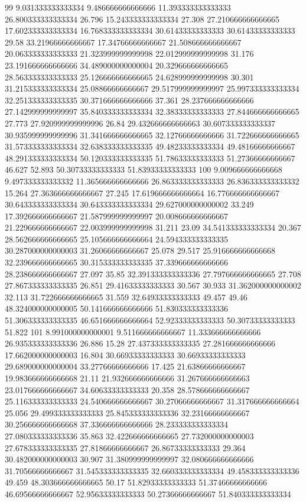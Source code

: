 99 9.031333333333334 9.486666666666666 11.393333333333333 26.800333333333334 26.796 15.243333333333334 27.308 27.210666666666665 17.602333333333334 16.768333333333334 30.61433333333333 30.61433333333333 29.58 33.21966666666667 17.34766666666667 21.508666666666667 20.063333333333333 21.323999999999998 22.012999999999998 31.176 23.191666666666666 34.489000000000004 20.329666666666665 28.563333333333333 25.126666666666665 24.628999999999998 30.301 31.215333333333334 25.08866666666667 29.517999999999997 25.997333333333334 32.251333333333335 30.371666666666666 37.361 28.237666666666666 27.142999999999997 35.840333333333334 32.38333333333333 27.844666666666665 27.773 27.920999999999996 26.84 29.432666666666663 30.607333333333337 30.935999999999996 31.341666666666665 32.12766666666666 31.722666666666665 31.573333333333334 32.638333333333335 49.48233333333334 49.48166666666667 48.291333333333334 50.120333333333335 51.78633333333333 51.27366666666667 46.627 52.893 50.30733333333333 51.83933333333333
100 9.009666666666668 9.497333333333332 11.365666666666666 26.863333333333333 26.836333333333332 15.264 27.363666666666667 27.245 17.619666666666664 16.776666666666667 30.643333333333334 30.643333333333334 29.627000000000002 33.249 17.392666666666667 21.587999999999997 20.008666666666667 21.229666666666667 22.003999999999998 31.211 23.09 34.541333333333334 20.367 28.562666666666665 25.105666666666664 24.594333333333335 30.287000000000003 31.26066666666667 25.078 29.517 25.916666666666668 32.239666666666665 30.315333333333335 37.339666666666666 28.238666666666667 27.097 35.85 32.391333333333336 27.797666666666665 27.708 27.867333333333335 26.851 29.41633333333333 30.567 30.933 31.362000000000002 32.113 31.722666666666665 31.559 32.64933333333333 49.457 49.46 48.324000000000005 50.141666666666666 51.830333333333336 51.306333333333335 46.651666666666664 52.92333333333333 50.30733333333333 51.822
101 8.991000000000001 9.511666666666667 11.333666666666666 26.935333333333336 26.886 15.28 27.437333333333335 27.281666666666666 17.662000000000003 16.804 30.66933333333333 30.66933333333333 29.689000000000004 33.27766666666666 17.425 21.63866666666667 19.983666666666668 21.11 21.932666666666666 31.267666666666663 23.017666666666667 34.60633333333333 20.358 28.578666666666667 25.116333333333333 24.540666666666667 30.27066666666667 31.317666666666664 25.056 29.499333333333333 25.845333333333336 32.23166666666667 30.256666666666668 37.336666666666666 28.233333333333334 27.080333333333336 35.863 32.422666666666665 27.732000000000003 27.678333333333335 27.81866666666667 26.86733333333333 29.364 30.482000000000003 30.907 31.380999999999997 32.080666666666666 31.70566666666667 31.545333333333335 32.660333333333334 49.458333333333336 49.459 48.303666666666665 50.17 51.82933333333333 51.37466666666666 46.69566666666667 52.95633333333333 50.27366666666667 51.840333333333334
